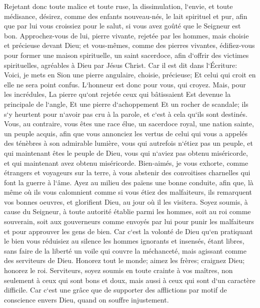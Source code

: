 \verse Rejetant donc toute malice et toute ruse, la dissimulation, l`envie, et toute médisance, 
\verse désirez, comme des enfants nouveau-nés, le lait spirituel et pur, afin que par lui vous croissiez pour le salut, 
\verse si vous avez goûté que le Seigneur est bon. 
\verse Approchez-vous de lui, pierre vivante, rejetée par les hommes, mais choisie et précieuse devant Dieu; 
\verse et vous-mêmes, comme des pierres vivantes, édifiez-vous pour former une maison spirituelle, un saint sacerdoce, afin d`offrir des victimes spirituelles, agréables à Dieu par Jésus Christ. 
\verse Car il est dit dans l`Écriture: Voici, je mets en Sion une pierre angulaire, choisie, précieuse; Et celui qui croit en elle ne sera point confus. 
\verse L`honneur est donc pour vous, qui croyez. Mais, pour les incrédules, La pierre qu`ont rejetée ceux qui bâtissaient Est devenue la principale de l`angle, Et une pierre d`achoppement Et un rocher de scandale; 
\verse ils s`y heurtent pour n`avoir pas cru à la parole, et c`est à cela qu`ils sont destinés. 
\verse Vous, au contraire, vous êtes une race élue, un sacerdoce royal, une nation sainte, un peuple acquis, afin que vous annonciez les vertus de celui qui vous a appelés des ténèbres à son admirable lumière, 
\verse vous qui autrefois n`étiez pas un peuple, et qui maintenant êtes le peuple de Dieu, vous qui n`aviez pas obtenu miséricorde, et qui maintenant avez obtenu miséricorde. 
\verse Bien-aimés, je vous exhorte, comme étrangers et voyageurs sur la terre, à vous abstenir des convoitises charnelles qui font la guerre à l`âme. 
\verse Ayez au milieu des païens une bonne conduite, afin que, là même où ils vous calomnient comme si vous étiez des malfaiteurs, ils remarquent vos bonnes oeuvres, et glorifient Dieu, au jour où il les visitera. 
\verse Soyez soumis, à cause du Seigneur, à toute autorité établie parmi les hommes, soit au roi comme souverain, 
\verse soit aux gouverneurs comme envoyés par lui pour punir les malfaiteurs et pour approuver les gens de bien. 
\verse Car c`est la volonté de Dieu qu`en pratiquant le bien vous réduisiez au silence les hommes ignorants et insensés, 
\verse étant libres, sans faire de la liberté un voile qui couvre la méchanceté, mais agissant comme des serviteurs de Dieu. 
\verse Honorez tout le monde; aimez les frères; craignez Dieu; honorez le roi. 
\verse Serviteurs, soyez soumis en toute crainte à vos maîtres, non seulement à ceux qui sont bons et doux, mais aussi à ceux qui sont d`un caractère difficile. 
\verse Car c`est une grâce que de supporter des afflictions par motif de conscience envers Dieu, quand on souffre injustement. 
